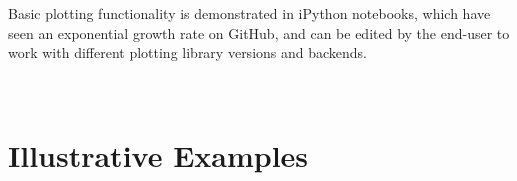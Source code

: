 Basic plotting functionality is demonstrated in iPython notebooks, which have seen an exponential growth rate on GitHub, and can be edited by the end-user to work with different plotting library versions and backends.




\
\section{Illustrative Examples}



